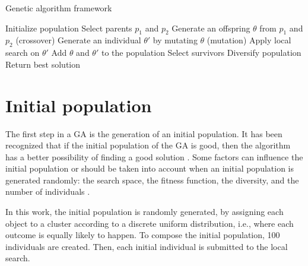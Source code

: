 
\begin{algorithm}[H]
\caption{Genetic algorithm framework}
\label{genetic-algo}
\begin{algorithmic}[1]
\STATE Initialize population
\STATE Select parents $p_1$ and $p_2$
\STATE Generate an offspring $\theta$ from $p_1$ and $p_2$ (crossover)
\STATE Generate an individual $\theta'$ by mutating $\theta$ (mutation)
\STATE Apply local search on $\theta'$
\STATE Add $\theta$ and $\theta'$ to the population
\STATE Select survivors
\STATE Diversify population
\ENDIF
\ENDIF
\ENDWHILE
\STATE Return best solution
\end{algorithmic}
\end{algorithm}

\section{Initial population}
The first step in a GA is the generation of an initial population. It has been recognized that if the initial population of the GA is good, then the algorithm has a better possibility of finding a good solution \cite{Burke2004, Zitzler2000}. Some factors can influence the initial population or should be taken into account when an initial population is generated randomly: the search space, the fitness function, the diversity, and the number of individuals \cite{DiazGomez2007}.

In this work, the initial population is randomly generated, by assigning each object to a cluster according to a discrete uniform distribution, i.e., where each outcome is equally likely to happen. To compose the initial population, 100 individuals are created. Then, each initial individual is submitted to the local search.

